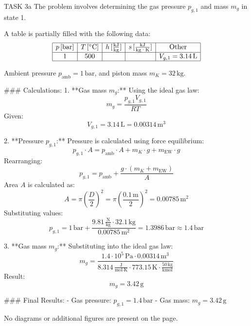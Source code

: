 TASK 3a  
The problem involves determining the gas pressure \( p_{g,1} \) and mass \( m_g \) in state 1.  

A table is partially filled with the following data:  
\[
\begin{array}{|c|c|c|c|c|}
\hline
p \, [\text{bar}] & T \, [^\circ\text{C}] & h \, [\frac{\text{kJ}}{\text{kg}}] & s \, [\frac{\text{kJ}}{\text{kg·K}}] & \text{Other} \\
\hline
1 & 500 & & & V_{g,1} = 3.14 \, \text{L} \\
\hline
\end{array}
\]

Ambient pressure \( p_{\text{amb}} = 1 \, \text{bar} \), and piston mass \( m_K = 32 \, \text{kg} \).  

### Calculations:  
1. **Gas mass \( m_g \):**  
   Using the ideal gas law:  
   \[
   m_g = \frac{p_{g,1} V_{g,1}}{R T}
   \]  
   Given:  
   \[
   V_{g,1} = 3.14 \, \text{L} = 0.00314 \, \text{m}^3
   \]

2. **Pressure \( p_{g,1} \):**  
   Pressure is calculated using force equilibrium:  
   \[
   p_{g,1} \cdot A = p_{\text{amb}} \cdot A + m_K \cdot g + m_{\text{EW}} \cdot g
   \]  
   Rearranging:  
   \[
   p_{g,1} = p_{\text{amb}} + \frac{g \cdot (m_K + m_{\text{EW}})}{A}
   \]  
   Area \( A \) is calculated as:  
   \[
   A = \pi \left( \frac{D}{2} \right)^2 = \pi \left( \frac{0.1 \, \text{m}}{2} \right)^2 = 0.00785 \, \text{m}^2
   \]  
   Substituting values:  
   \[
   p_{g,1} = 1 \, \text{bar} + \frac{9.81 \, \frac{\text{N}}{\text{kg}} \cdot 32.1 \, \text{kg}}{0.00785 \, \text{m}^2} = 1.3986 \, \text{bar} \approx 1.4 \, \text{bar}
   \]

3. **Gas mass \( m_g \):**  
   Substituting into the ideal gas law:  
   \[
   m_g = \frac{1.4 \cdot 10^5 \, \text{Pa} \cdot 0.00314 \, \text{m}^3}{8.314 \, \frac{\text{J}}{\text{mol·K}} \cdot 773.15 \, \text{K} \cdot \frac{50 \, \text{kg}}{\text{kmol}}}
   \]  
   Result:  
   \[
   m_g = 3.42 \, \text{g}
   \]  

### Final Results:  
- Gas pressure: \( p_{g,1} = 1.4 \, \text{bar} \)  
- Gas mass: \( m_g = 3.42 \, \text{g} \)  

No diagrams or additional figures are present on the page.